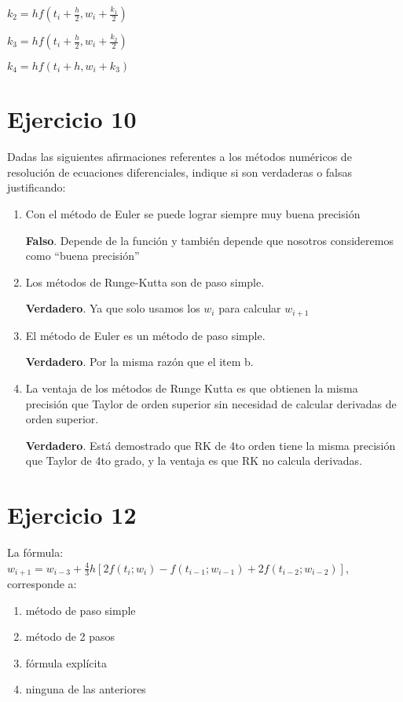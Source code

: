 \documentclass[11pt]{article}
\begin{document}
	$\displaystyle k_2=hf\left(t_i+\frac{h}{2}, w_i+\frac{k_1}{2}\right)$
	
	$\displaystyle k_3=hf\left(t_i+\frac{h}{2},w_i+\frac{k_2}{2}\right)$
	
	$\displaystyle k_4=hf\left(t_i+h,w_i+k_3\right)$
	
	\section{Ejercicio 10}
	Dadas las siguientes afirmaciones referentes a los métodos numéricos de resolución de ecuaciones diferenciales, indique si son verdaderas o falsas justificando:
	
	\begin{enumerate}[label=\alph*)]
		\item Con el método de Euler se puede lograr siempre muy buena precisión
		
		\textbf{Falso}. Depende de la función y también depende que nosotros consideremos como ``buena precisión''\\
		
		\item Los métodos de Runge-Kutta son de paso simple.
		
		\textbf{Verdadero}. Ya que solo usamos los $w_i$ para calcular $w_{i+1}$ \\
		
		\item El método de Euler es un método de paso simple.
		
		\textbf{Verdadero}. Por la misma razón que el item b.\\
		
		\item La ventaja de los métodos de Runge Kutta es que obtienen la misma precisión que Taylor de orden superior sin necesidad de calcular derivadas de orden superior.
		
		\textbf{Verdadero}. Está demostrado que RK de 4to orden tiene la misma precisión que Taylor de 4to grado, y la ventaja es que RK no calcula derivadas.
	\end{enumerate}	

	\section{Ejercicio 12}
	La fórmula: $\displaystyle w_{i+1}=w_{i-3}+\frac{4}{3}h[2f(t_i;w_i)-f(t_{i-1};w_{i-1})+2f(t_{i-2};w_{i-2})]$, corresponde a:
	
	\begin{enumerate}[label=\alph*)]
		\item método de paso simple
		\item método de 2 pasos
		\item fórmula explícita
		\item ninguna de las anteriores
	\end{enumerate}
\end{document}
